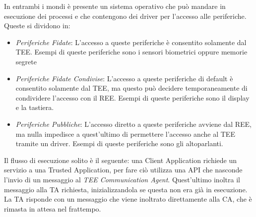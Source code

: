 \documentclass[12pt,italian]{report}
\begin{document}
In entrambi i mondi è presente un sistema operativo che può mandare in
esecuzione dei processi e che contengono dei driver per l'accesso alle
periferiche. Queste si dividono in:
\begin{itemize}
    \item \textit{Periferiche Fidate}: L'accesso a queste periferiche è
    consentito solamente dal TEE. Esempi di queste periferiche sono i
    sensori biometrici oppure memorie segrete %
    \item \textit{Periferiche Fidate Condivise}: L'accesso a queste
    periferiche di default è consentito solamente dal TEE, ma questo può
    decidere temporaneamente di condividere l'accesso con il REE. Esempi di
    queste periferiche sono il display e la tastiera.
    \item \textit{Periferiche Pubbliche}: L'accesso diretto a queste
    periferiche avviene dal REE, ma nulla impedisce a quest'ultimo di
    permettere l'accesso anche al TEE tramite un driver. Esempi di queste
    periferiche sono gli altoparlanti.
\end{itemize}

Il flusso di esecuzione solito è il seguente: una Client Application richiede
un servizio a una Trusted Application, per fare ciò utilizza una API che
nasconde l'invio di un messaggio al \textit{TEE Communication Agent}.
Quest'ultimo inoltra il messaggio alla TA richiesta, inizializzandola se
questa non era già in esecuzione. La TA risponde con un messaggio che viene
inoltrato direttamente alla CA, che è rimasta in attesa nel frattempo.


\end{document}
